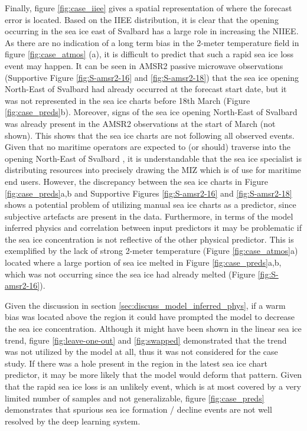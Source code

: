 \documentclass[../main/thesis]{subfiles}
\begin{document}
Finally, figure \ref{fig:case_iiee} gives a spatial representation of where the forecast error is located. Based on the IIEE distribution, it is clear that the opening occurring in the sea ice east of Svalbard has a large role in increasing the NIIEE. As there are no indication of a long term bias in the 2-meter temperature field in figure \ref{fig:case_atmos} (a), it is difficult to predict that such a rapid sea ice loss event may happen. It can be seen in AMSR2 passive microwave observations (Supportive Figure \ref{fig:S-amsr2-16} and \ref{fig:S-amsr2-18}) that the sea ice opening North-East of Svalbard had already occurred at the forecast start date, but it was not represented in the sea ice charts before 18th March (Figure \ref{fig:case_preds}b). Moreover, signs of the sea ice opening North-East of Svalbard was already present in the AMSR2 observations at the start of March (not shown). This shows that the sea ice charts are not following all observed events. Given that no maritime operators are expected to (or should) traverse into the opening North-East of Svalbard \citep{Stocker2020}, it is understandable that the sea ice specialist is distributing resources into precisely drawing the MIZ which is of use for maritime end users. However, the discrepancy between the sea ice charts in Figure \ref{fig:case_preds}a,b and Supportive Figures \ref{fig:S-amsr2-16} and {\ref{fig:S-amsr2-18}} shows a potential problem of utilizing manual sea ice charts as a predictor, since subjective artefacts are present in the data. Furthermore, in terms of the model inferred physics and correlation between input predictors it may be problematic if the sea ice concentration is not reflective of the other physical predictor. This is exemplified by the lack of strong 2-meter temperature (Figure \ref{fig:case_atmos}a) located where a large portion of sea ice melted in Figure \ref{fig:case_preds}a,b, which was not occurring since the sea ice had already melted (Figure \ref{fig:S-amsr2-16}).

Given the discussion in section \ref{sec:discuss_model_inferred_phys}, if a warm bias was located above the region it could have prompted the model to decrease the sea ice concentration. Although it might have been shown in the linear sea ice trend, figure \ref{fig:leave-one-out} and \ref{fig:swapped} demonstrated that the trend was not utilized by the model at all, thus it was not considered for the case study. If there was a hole present in the region in the latest sea ice chart predictor, it may be more likely that the model would deform that pattern. Given that the rapid sea ice loss is an unlikely event, which is at most covered by a very limited number of samples and not generalizable, figure \ref{fig:case_preds} demonstrates that spurious sea ice formation / decline events are not well resolved by the deep learning system.

\biblio
\end{document}
